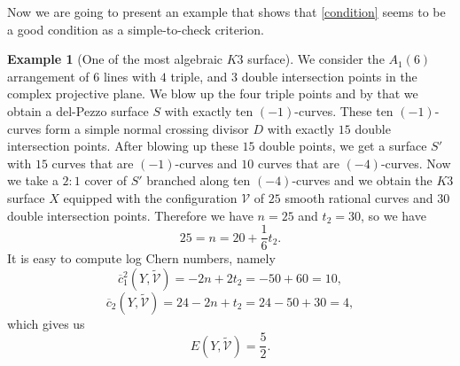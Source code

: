\documentclass{article}
\theoremstyle{plain}
\theoremstyle{definition}
\newtheorem{example}[thm]{Example}
\numberwithin{equation}{section}
\begin{document}
Now we are going to present an example that shows that \eqref{condition} seems to be a good condition as a simple-to-check criterion.
\begin{example}[One of the most algebraic $K3$ surface]
We consider the $A_{1}(6)$ arrangement of $6$ lines with $4$ triple, and $3$ double intersection points in the complex projective plane. We blow up the four triple points and by that we obtain a del-Pezzo surface $S$ with exactly ten $(-1)$-curves. These ten $(-1)$-curves form a simple normal crossing divisor $D$ with exactly $15$ double intersection points. After blowing up these $15$ double points, we get a surface $S'$ with $15$ curves that are $(-1)$-curves and $10$ curves that are $(-4)$-curves. Now we take a $2:1$ cover of $S'$ branched along ten $(-4)$-curves and we obtain the $K3$ surface $X$ equipped with the configuration $\mathcal{V}$ of $25$ smooth rational curves and $30$ double intersection points. Therefore we have $n=25$ and $t_{2}=30$, so we have 
\[25 = n =  20 + \frac{1}{6}t_{2}.\]
It is easy to compute log Chern numbers, namely
\[\overline{c}_{1}^{2}(Y,\widetilde{\mathcal{V}}) = -2n + 2t_{2} = -50 + 60 = 10,\]
\[\overline{c}_{2}(Y,\widetilde{\mathcal{V}}) = 24 -2n + t_{2} = 24 - 50 + 30 = 4,\]
which gives us \[E(Y,\widetilde{\mathcal{V}}) = \frac{5}{2}.\]
\end{example}
\end{document}
